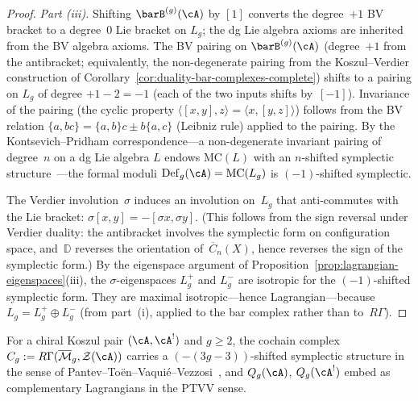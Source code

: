 \begin{proof}
\emph{Part (iii).}
Shifting $\barB^{(g)}(\cA)$ by $[1]$ converts the degree~$+1$ BV
bracket to a degree~$0$ Lie bracket on $L_g$; the dg Lie algebra
axioms are inherited from the BV algebra axioms.  The BV pairing on
$\barB^{(g)}(\cA)$ (degree~$+1$ from the antibracket; equivalently,
the non-degenerate pairing from the Koszul--Verdier construction of
Corollary~\ref{cor:duality-bar-complexes-complete}) shifts to a
pairing on $L_g$ of degree $+1 - 2 = -1$
(each of the two inputs shifts by~$[-1]$).
Invariance of the pairing (the cyclic property
$\langle [x,y], z \rangle = \langle x, [y,z] \rangle$)
follows from the BV relation
$\{a, bc\} = \{a,b\}c \pm b\{a,c\}$ (Leibniz rule) applied to
the pairing.  By the Kontsevich--Pridham correspondence---a
non-degenerate invariant pairing of degree~$n$ on a dg Lie algebra
$L$ endows $\mathrm{MC}(L)$ with an $n$-shifted symplectic
structure~\cite{Pridham17}---the formal moduli
$\mathrm{Def}_g(\cA) = \mathrm{MC}(L_g)$ is $(-1)$-shifted
symplectic.

The Verdier involution~$\sigma$ induces an involution on~$L_g$ that
anti-commutes with the Lie bracket:
$\sigma[x,y] = -[\sigma x, \sigma y]$.
(This follows from the sign reversal under Verdier duality: the
antibracket involves the symplectic form on configuration space,
and~$\mathbb{D}$ reverses the orientation of~$\overline{C}_n(X)$,
hence reverses the sign of the symplectic form.)
By the eigenspace argument of
Proposition~\ref{prop:lagrangian-eigenspaces}(iii), the
$\sigma$-eigenspaces $L_g^+$ and $L_g^-$ are isotropic for the
$(-1)$-shifted symplectic form.  They are maximal isotropic---hence
Lagrangian---because $L_g = L_g^+ \oplus L_g^-$ (from part~(i),
applied to the bar complex rather than to~$R\Gamma$).
\end{proof}

\begin{proposition}
\label{prop:ptvv-lagrangian}
For a chiral Koszul pair $(\cA, \cA^!)$ and $g \geq 2$, the cochain
complex
$C_g := R\Gamma(\overline{\mathcal{M}}_g, \mathcal{Z}(\cA))$
carries a $(-(3g{-}3))$-shifted symplectic structure in the sense of
Pantev--To\"en--Vaqui\'e--Vezzosi~\cite{PTVV13}, and
$Q_g(\cA)$, $Q_g(\cA^!)$ embed as complementary Lagrangians in the
PTVV sense.
\end{proposition}

